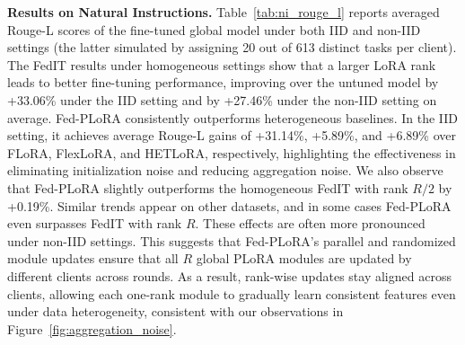 \documentclass{article} %
\begin{document}
\noindent\textbf{Results on Natural Instructions.} Table~\ref{tab:ni_rouge_l} reports averaged Rouge-L scores of the fine-tuned global model under both IID and non-IID settings (the latter simulated by assigning 20 out of 613 distinct tasks per client).
{The FedIT results under homogeneous settings show that a larger LoRA rank leads to better fine-tuning performance, improving over the untuned model by +33.06\% under the IID setting 
and by +27.46\% under the non-IID setting on average.}
% 
Fed-PLoRA consistently outperforms heterogeneous baselines. In the IID setting, it achieves average Rouge-L gains of +31.14\%, +5.89\%, and +6.89\% over FLoRA, FlexLoRA, and HETLoRA, respectively, highlighting the effectiveness in eliminating initialization noise and reducing aggregation noise. 
% 
We also observe that Fed-PLoRA slightly outperforms the homogeneous FedIT with rank $R/2$ by +0.19\%. Similar trends appear on other datasets, and in some cases Fed-PLoRA even surpasses FedIT with rank $R$. These effects are often more pronounced under non-IID settings. This suggests that Fed-PLoRA’s parallel and randomized module updates ensure that all $R$ global PLoRA modules are updated by different clients across rounds. As a result, rank-wise updates stay aligned across clients, allowing each one-rank module to gradually learn consistent features even under data heterogeneity, consistent with our observations in Figure~\ref{fig:aggregation_noise}. 
\end{document}
